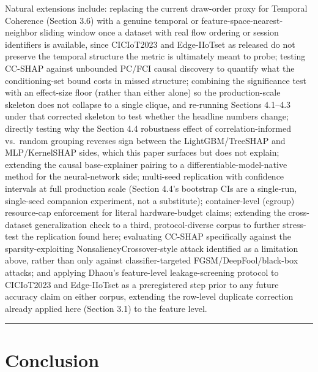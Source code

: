 Natural extensions include: replacing the current draw-order proxy for Temporal Coherence (Section 3.6) with a genuine temporal or feature-space-nearest-neighbor sliding window once a dataset with real flow ordering or session identifiers is available, since CICIoT2023 and Edge-IIoTset as released do not preserve the temporal structure the metric is ultimately meant to probe; testing CC-SHAP against unbounded PC/FCI causal discovery to quantify what the conditioning-set bound costs in missed structure; combining the significance test with an effect-size floor (rather than either alone) so the production-scale skeleton does not collapse to a single clique, and re-running Sections 4.1--4.3 under that corrected skeleton to test whether the headline numbers change; directly testing why the Section 4.4 robustness effect of correlation-informed vs.~random grouping reverses sign between the LightGBM/TreeSHAP and MLP/KernelSHAP sides, which this paper surfaces but does not explain; extending the causal base-explainer pairing to a differentiable-model-native method for the neural-network side; multi-seed replication with confidence intervals at full production scale (Section 4.4's bootstrap CIs are a single-run, single-seed companion experiment, not a substitute); container-level (cgroup) resource-cap enforcement for literal hardware-budget claims; extending the cross-dataset generalization check to a third, protocol-diverse corpus to further stress-test the replication found here; evaluating CC-SHAP specifically against the sparsity-exploiting NonsaliencyCrossover-style attack \citep{ref32} identified as a limitation above, rather than only against classifier-targeted FGSM/DeepFool/black-box attacks; and applying Dhaou's feature-level leakage-screening protocol \citep{ref23} to CICIoT2023 and Edge-IIoTset as a preregistered step prior to any future accuracy claim on either corpus, extending the row-level duplicate correction already applied here (Section 3.1) to the feature level.

\begin{center}\rule{0.5\linewidth}{0.5pt}\end{center}

\section{Conclusion}\label{conclusion}

